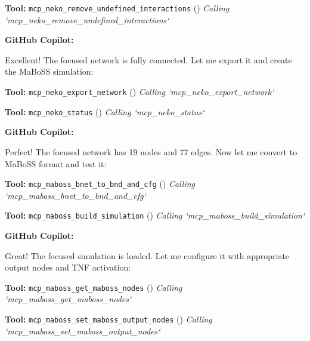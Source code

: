 \documentclass[11pt,a4paper]{article}
\begin{document}
\begin{toolokbox}
\textbf{Tool:} \texttt{mcp\_neko\_remove\_undefined\_interactions} (\checkmark)
\textit{Calling `mcp\_neko\_remove\_undefined\_interactions`}
\end{toolokbox}
\begin{copilotbox}
\textbf{GitHub Copilot:}

Excellent! The focused network is fully connected. Let me export it and create the MaBoSS simulation:

\end{copilotbox}
\begin{toolokbox}
\textbf{Tool:} \texttt{mcp\_neko\_export\_network} (\checkmark)
\textit{Calling `mcp\_neko\_export\_network`}
\end{toolokbox}
\begin{toolokbox}
\textbf{Tool:} \texttt{mcp\_neko\_status} (\checkmark)
\textit{Calling `mcp\_neko\_status`}
\end{toolokbox}
\begin{copilotbox}
\textbf{GitHub Copilot:}

Perfect! The focused network has 19 nodes and 77 edges. Now let me convert to MaBoSS format and test it:

\end{copilotbox}
\begin{toolokbox}
\textbf{Tool:} \texttt{mcp\_maboss\_bnet\_to\_bnd\_and\_cfg} (\checkmark)
\textit{Calling `mcp\_maboss\_bnet\_to\_bnd\_and\_cfg`}
\end{toolokbox}
\begin{toolokbox}
\textbf{Tool:} \texttt{mcp\_maboss\_build\_simulation} (\checkmark)
\textit{Calling `mcp\_maboss\_build\_simulation`}
\end{toolokbox}
\begin{copilotbox}
\textbf{GitHub Copilot:}

Great! The focused simulation is loaded. Let me configure it with appropriate output nodes and TNF activation:

\end{copilotbox}
\begin{toolokbox}
\textbf{Tool:} \texttt{mcp\_maboss\_get\_maboss\_nodes} (\checkmark)
\textit{Calling `mcp\_maboss\_get\_maboss\_nodes`}
\end{toolokbox}
\begin{toolokbox}
\textbf{Tool:} \texttt{mcp\_maboss\_set\_maboss\_output\_nodes} (\checkmark)
\textit{Calling `mcp\_maboss\_set\_maboss\_output\_nodes`}
\end{toolokbox}
\end{document}
